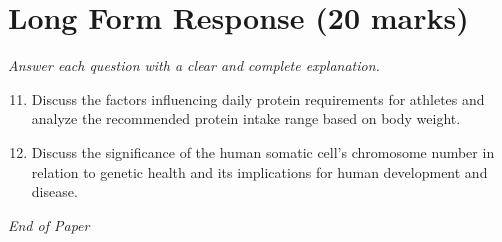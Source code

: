 \documentclass[12pt]{article}
\begin{document}
\section*{Long Form Response (20 marks)}
\textit{Answer each question with a clear and complete explanation.}
\begin{enumerate}[label=\arabic*.]
\setcounter{enumi}{10}
\item Discuss the factors influencing daily protein requirements for athletes and analyze the
recommended protein intake range based on body weight.
\item Discuss the significance of the human somatic cell's chromosome number in relation to
genetic health and its implications for human development and disease.
\end{enumerate}

\vfill
\noindent\textit{End of Paper}
\end{document}
